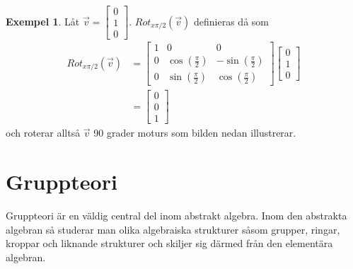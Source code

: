 \documentclass{article}
\theoremstyle{definition}
\newtheorem{exmp}[thm]{Exempel}
\begin{document}
\begin{exmp}
  Låt $\vec{v} = \begin{bmatrix}
    0 \\
    1 \\
    0
  \end{bmatrix}.$
  $Rot_{x \pi/2} (\vec{v})$ definieras då som
  \begin{align*}
    Rot_{x \pi/2} (\vec{v}) &= 
    \begin{bmatrix}
        1 & 0 & 0 \\
        0 & \cos(\frac{\pi}{2}) & -\sin(\frac{\pi}{2}) \\
        0 & \sin(\frac{\pi}{2}) & \cos(\frac{\pi}{2})
    \end{bmatrix}
    \begin{bmatrix}
      0 \\
      1 \\
      0
    \end{bmatrix} \\
    &= \begin{bmatrix}
      0 \\
      0 \\
      1
    \end{bmatrix}
  \end{align*}
  och roterar alltså $\vec{v}$ 90 grader moturs som bilden nedan illustrerar.
  \begin{center}
  \end{center}
\end{exmp}

\section{Gruppteori}
Gruppteori är en väldig central del inom abstrakt algebra. 
Inom den abstrakta algebran så studerar man olika algebraiska strukturer
såsom grupper, ringar, kroppar och liknande strukturer och skiljer sig därmed från den elementära algebran. 
\end{document}
